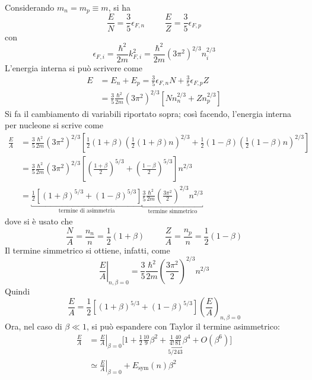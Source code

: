 \documentclass[11pt, a4paper]{scrartcl}
\theoremstyle{style}
\newcommand*\Eval[3]{\left.#1\right\rvert_{#2}^{#3}}
\numberwithin{equation}{subsection}
\begin{document}
\noindent Considerando $m_n = m_p \equiv m$, si ha 
\[
\frac{E}{N} = \frac{3}{5} \epsilon _{F,n} \hspace{1cm} \frac{E}{Z} = \frac{3}{5} \epsilon _{F,p}
\] 
con 
\[
\epsilon _{F,i} = \frac{\hbar^2 }{2m} k_{F,i}^2 = \frac{\hbar ^2}{2m} \left(3\pi ^2\right) ^{2 / 3} n_i^{2 / 3}
\] 
L'energia interna si pu\`o scrivere come
\[
	\begin{split}
		E &= E_n + E_p = \frac{3}{5} \epsilon _{F,n}N + \frac{3}{5} \epsilon _{F,p} Z \\
		  &= \frac{3}{5} \frac{\hbar ^2}{2m}\left(3\pi^2\right) ^{2 / 3} \left[ N n_n^{2 / 3} + Z n_p^{2 / 3} \right] 
	\end{split}
\] 
Si fa il cambiamento di variabili riportato sopra; cos\`i facendo, l'energia interna per nucleone si scrive come
\[
	\begin{split}
		\frac{E}{A} &= \frac{3}{5} \frac{\hbar ^2}{2m} (3\pi^2)^{2/3}\left[ \frac{1}{2} \left(1 + \beta \right) \left(\frac{1}{2}(1+\beta ) n\right) ^{2 / 3} + \frac{1}{2}\left(1-\beta \right) \left(\frac{1}{2}(1-\beta ) n\right) ^{2 / 3}\right] \\
			    & = \frac{3}{5} \frac{\hbar ^2}{2m} (3 \pi ^2) ^{2 / 3} \left[ \left(\frac{1+\beta }{2}\right) ^{ 5 / 3} + \left(\frac{1-\beta }{2}\right) ^{ 5 / 3}  \right] n^{2 / 3}\\
			    & = \underbracket{\frac{1}{2} \left[ \left(1+\beta \right) ^{5 / 3} + (1-\beta )^{5 / 3} \right]}_{\text{termine di asimmetria}} \underbracket{\frac{3}{5}\frac{\hbar ^2}{2m} \left(\frac{3\pi^2}{2}\right) ^{ 2 / 3} n^{2 / 3}}_{\text{termine simmetrico}}
	\end{split}
\] 
dove si \`e usato che 
\[
\frac{N}{A} = \frac{n_n}{n} = \frac{1}{2} (1+\beta )\hspace{1cm}\frac{Z}{A} = \frac{n_p}{n} = \frac{1}{2} (1-\beta )
\] 
Il termine simmetrico si ottiene, infatti, come
\[
	\Eval{\frac{E}{A}}{n,\beta = 0}{} = \frac{3}{5} \frac{\hbar ^2}{2m} \left(\frac{3\pi^2}{2}\right) ^{2 /3} n^{2 / 3}
\] 
Quindi
\[
\frac{E}{A} = \frac{1}{2} \left[ \left(1+\beta \right) ^{5 / 3} + \left(1-\beta \right) ^{5 / 3} \right] \left(\frac{E}{A}\right) _{n,\beta =0}
\] 
Ora, nel caso di $\beta \ll 1$, si pu\`o espandere con Taylor il termine asimmetrico:
\[
	\begin{split}
		\frac{E}{A} &= \Eval{\frac{E}{A}}{\beta =0}{} \Bigg[ 1 + \frac{1}{2}\frac{10}{9} \beta ^2 + \underbracket{\frac{1}{4!}\frac{40}{81}}_{5 / 243} \beta ^4 + O\left(\beta ^6\right)  \Bigg] \\
			    & \simeq \Eval{\frac{E}{A}}{\beta =0}{} + E_\text{sym}(n) \beta ^2
	\end{split}
\] 
\end{document}

